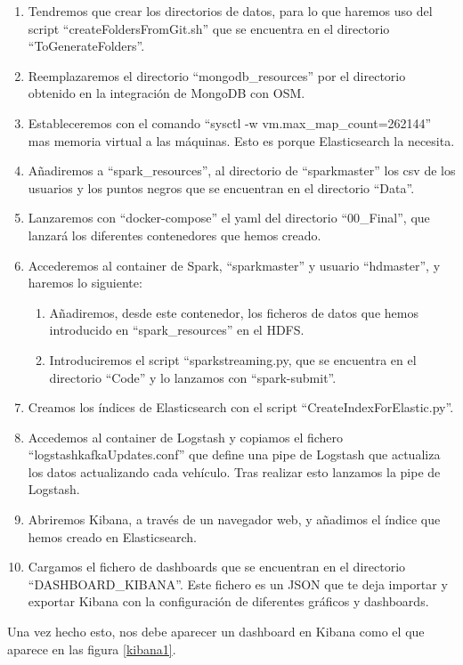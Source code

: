 \begin{enumerate}
\item Tendremos que crear los directorios de datos, para lo que haremos uso del script “createFoldersFromGit.sh” que se encuentra en el directorio “ToGenerateFolders”.
\item Reemplazaremos el directorio “mongodb\_resources” por el directorio obtenido en la integración de MongoDB con OSM.
\item Estableceremos con el comando “sysctl -w vm.max\_map\_count=262144” mas memoria virtual a las máquinas. Esto es porque Elasticsearch la necesita.
\item Añadiremos a “spark\_resources”, al directorio de “sparkmaster”  los csv de los usuarios y los puntos negros que se encuentran en el directorio “Data”. 
\item Lanzaremos con “docker-compose” el yaml del directorio “00\_Final”, que lanzará los diferentes contenedores que hemos creado.
\item Accederemos al container de Spark, “sparkmaster” y usuario “hdmaster”, y haremos lo siguiente:
\begin{enumerate}
\item Añadiremos, desde este contenedor, los ficheros de datos que hemos introducido en “spark\_resources” en el HDFS. 
\item Introduciremos el script “sparkstreaming.py, que se encuentra en el directorio “Code” y lo lanzamos con “spark-submit”.
\end{enumerate}
\item Creamos los índices de Elasticsearch con el script “CreateIndexForElastic.py”.
\item Accedemos al container de Logstash y copiamos el fichero “logstashkafkaUpdates.conf” que define una pipe de Logstash que actualiza los datos actualizando cada vehículo. Tras realizar esto lanzamos la pipe de Logstash.
\item Abriremos Kibana, a través de un navegador web, y añadimos el índice que hemos creado en Elasticsearch.
\item Cargamos el fichero de dashboards que se encuentran en el directorio “DASHBOARD\_KIBANA”. Este fichero es un JSON que te deja importar y exportar Kibana con la configuración de diferentes gráficos y dashboards.
\end{enumerate}

Una vez hecho esto, nos debe aparecer un dashboard en Kibana como el que aparece en las figura \ref{kibana1}.\par

